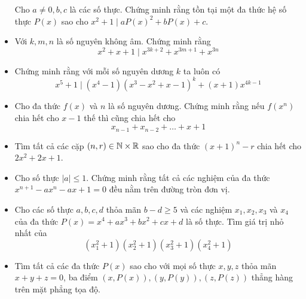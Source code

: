 \documentclass[11pt]{scrartcl}
\begin{document}
\begin{itemize}[label=, leftmargin=0em, itemsep=-0em]
\begin{btvn}
            Cho $a \neq 0,b,c$ là các số thực. Chứng minh rằng tồn tại một đa thức hệ số thực $P(x)$ sao cho $x^2 + 1 \mid aP(x)^2 + bP(x) + c$.
        \end{btvn}
        \item \begin{btvn}
            Với $k,m,n$ là số nguyên không âm. Chứng minh rằng
            \[
                x^2 + x + 1 \mid x^{3k + 2} + x^{3m + 1} + x^{3n}
            \]
        \end{btvn}
        \item \begin{btvn}
            Chứng minh rằng với mỗi số nguyên dương $k$ ta luôn có
            \[
                x^5 + 1 \mid (x^4 - 1)(x^3 - x^2 + x - 1)^k + (x + 1)x^{4k - 1}
            \]
        \end{btvn}
        \item \begin{btvn}
            Cho đa thức $f(x)$ và $n$ là số nguyên dương. Chứng minh rằng nếu $f(x^n)$ chia hết cho $x - 1$ thế thì cũng chia hết cho
            \[
                x_{n - 1} + x_{n - 2} +\dots + x + 1
            \]
        \end{btvn}
        \item \begin{btvn}
            Tìm tất cả các cặp $(n,r) \in \mathbb{N} \times \mathbb{R}$ sao cho đa thức $(x + 1)^n - r$ chia hết cho $2x^2 + 2x + 1$.
        \end{btvn}
        \item \begin{btvn}
            Cho số thực $|a| \leq 1$. Chứng minh rằng tất cả các nghiệm của đa thức $x^{n + 1} -ax^n -ax + 1 = 0$ đều nằm trên đường tròn đơn vị.
        \end{btvn}
        \item \begin{btvn}
            Cho các số thực $a,b,c,d$ thỏa mãn $b - d \geq 5$ và các nghiệm $x_1,x_2,x_3$ và $x_4$ của đa thức $P(x) = x^4 +ax^3 + bx^2 + cx + d$ là số thực. Tìm giá trị nhỏ nhất của
            \[
                (x_1^2 + 1)(x_2^2 + 1)(x_3^2 + 1)(x_4^2 + 1)
            \]
        \end{btvn}
        \item \begin{btvn}
            Tìm tất cả các đa thức $P(x)$ sao cho với mọi số thực $x,y,z$ thỏa mãn $x + y + z = 0$, ba điểm $(x,P(x)), (y,P(y)),(z,P(z))$ thẳng hàng trên mặt phẳng tọa độ.
        \end{btvn}


\end{itemize}
\end{document}
